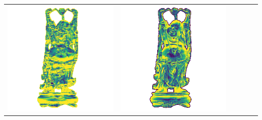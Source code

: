 \begin{tabularx}{\linewidth}{@{}Y@{}Y@{}Y@{}Y@{}Y@{}Y@{}}
\includegraphics[width=\linewidth]{semisynthetic/20150514_20_yu_err.png} &
\includegraphics[width=\linewidth]{semisynthetic/20150514_20_dpsn_err.png} &

\end{tabularx}
